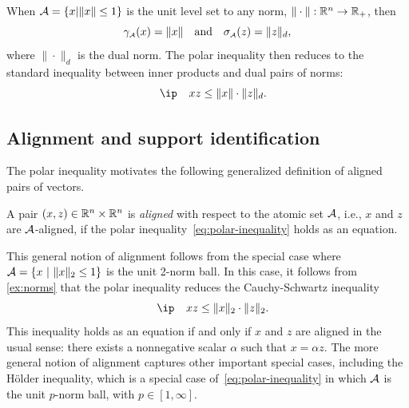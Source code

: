 \begin{example}[Norms] \label{ex:norms}
    When $\mathcal{A}=\{x|\|x\|\le1\}$ is the unit level set to any norm,
  $\|\cdot\|:\mathbb{R}^n\to\mathbb{R}_+$, then
  \[
    \gamma_{\scriptscriptstyle\mathcal{A}}(x) = \|x\|
    \hbox{\quad and\quad}
    \sigma_{\scriptscriptstyle\mathcal{A}}(z) = \|z\|_d,
  \]
  where $\|\cdot\|_d$ is the dual norm. The polar inequality then reduces to the
  standard inequality between inner products and dual pairs of norms:
  \[
    \ip x z \le \|x\|\cdot \|z\|_d. 
  \]
\end{example}

\subsection{Alignment and support identification}

The polar inequality motivates the following generalized definition of aligned
pairs of vectors.
\begin{definition}[Alignment] \label{def:alignment} A pair
  $(x,z)\in\mathbb{R}^n\times\mathbb{R}^n$ is \emph{aligned} with respect to the atomic
  set $\mathcal{A}$, i.e., $x$ and $z$ are $\mathcal{A}$-aligned, if the polar
  inequality~\eqref{eq:polar-inequality} holds as an equation.
\end{definition}

This general notion of alignment follows from the special case where
$\mathcal{A}=\{x~|~\|x\|_2 \leq 1\}$ is the unit 2-norm ball. In this case, it follows
from \autoref{ex:norms} that the polar inequality reduces the Cauchy-Schwartz inequality
\begin{equation*}
  \label{eq:cauchy-inequality}
  \ip x z \le \norm{x}_2\cdot\norm{z}_2.
\end{equation*}
This inequality holds as an equation if and only if $x$ and $z$ are aligned in
the usual sense: there exists a nonnegative scalar $\alpha$ such that
$x=\alpha z$. The more general notion of alignment captures other important special
cases, including the H\"older inequality, which is a
special case of~\eqref{eq:polar-inequality} in which $\mathcal{A}$ is the unit
$p$-norm ball, with $p\in[1,\infty]$.

